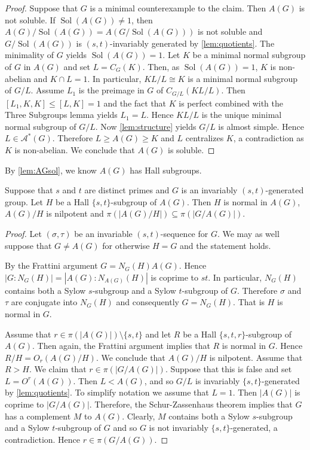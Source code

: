 \documentclass[12pt,a4paper]{amsart}
\DeclareMathOperator{\Sol}{Sol}
\begin{document}
\begin{proof}
Suppose that $G$ is a minimal counterexample to the claim. Then $A(G)$ is not soluble. If $\Sol(A(G)) \ne 1$, then $A(G)/\Sol(A(G)) =A(G/\Sol(A(G)))$ is not soluble and $G/\Sol(A(G)) $ is $(s,t)$-invariably generated by \cref{lem:quotients}. The minimality of $G$ yields $\Sol(A(G))=1$. Let $K$ be a minimal normal subgroup of $G$ in  $A(G)$ and set $L= C_{G}(K)$. Then, as $\Sol(A(G))=1$, $K$ is non-abelian and $K \cap L=1$. In particular, $KL/L\cong K$ is a minimal normal subgroup of $G/L$. Assume $L_1$ is the preimage in $G$ of $C_{G/L}(KL/L)$. Then $[L_1,K,K]\le [L,K]=1$ and the fact that $K$ is perfect combined with the Three Subgroups lemma yields $L_1=L$. Hence $KL/L$ is the unique minimal normal subgroup of $G/L$.
Now \cref{lem:structure} yields $G/L$ is almost simple. Hence $L \in  \mathcal A^*(G)$. Therefore $L \ge A(G)\ge K$ and $L$ centralizes $K$, a contradiction as $K$ is non-abelian. We conclude that $A(G)$ is soluble.
\end{proof}


By \cref{lem:AGsol}, we know $A(G)$ has   Hall  subgroups.

\begin{lemma}\label{lem:A(G) structure}
Suppose that $s$ and $t$ are distinct primes  and $G$ is an invariably  $(s,t)$-generated group. Let $H$ be a Hall $\{s,t\}$-subgroup of $A(G)$.  Then $H$ is normal in $A(G)$, $A(G)/H$ is nilpotent and $\pi(|A(G)/H|)\subseteq \pi(|G/A(G)|).$
\end{lemma}

\begin{proof} Let $(\sigma, \tau)$ be an invariable $(s,t)$-sequence for $G$. We may as well suppose that  $G \ne A(G)$ for otherwise $H=G$ and the statement holds.

By the Frattini argument $G= N_G(H)A(G)$. Hence $|G:N_G(H)|=|A(G):N_{A(G)}(H)|$ is coprime to $st$. In particular, $N_G(H)$ contains both a Sylow $s$-subgroup and a Sylow $t$-subgroup of $G$. Therefore $\sigma$ and $\tau$ are conjugate   into $N_G(H)$ and consequently $G= N_G(H)$. That is $H$ is normal in $G$.

Assume that $r  \in \pi(|A(G)|)\setminus \{s,t\}$ and let $R$ be a Hall $\{s,t,r\}$-subgroup of $A(G)$. Then again, the Frattini argument implies that $R$ is normal in $G$. Hence $R/H= O_r(A(G)/H)$. We conclude that $A(G)/H$ is nilpotent. Assume that $R> H$. We claim that $r \in \pi(|G/A(G)|)$. Suppose that this is false and set $L= O^r(A(G))$. Then $L< A(G)$, and so $G/L$ is invariably $\{s,t\}$-generated by \cref{lem:quotients}. To simplify notation we assume that $L=1$. Then $|A(G)|$  is coprime to $|G/A(G)|$. Therefore, the Schur-Zassenhaus theorem implies that $G$ has a complement $M$ to $A(G)$. Clearly, $M$ contains both a Sylow $s$-subgroup and a Sylow $t$-subgroup of $G$ and so $G$ is not invariably $\{s,t\}$-generated, a contradiction. Hence $r \in \pi(G/A(G))$.
\end{proof}
\end{document}
